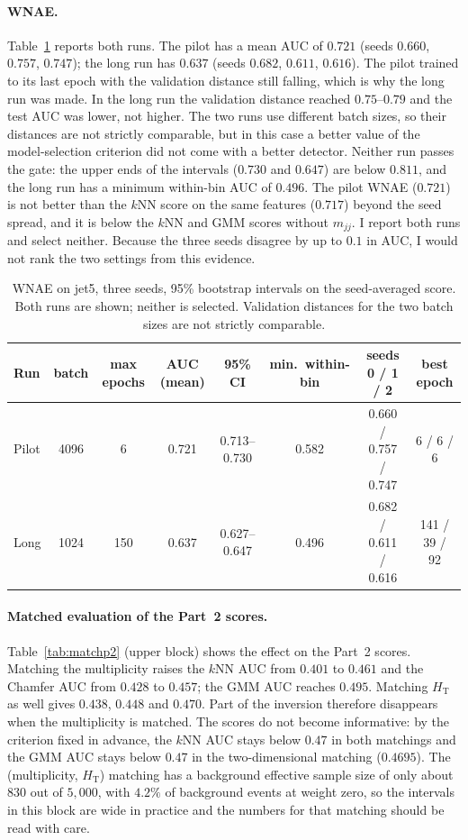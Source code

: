 \documentclass[11pt,a4paper]{article}
\newcommand{\HT}{\ensuremath{H_\mathrm{T}}\xspace}
\newcommand{\mjj}{\ensuremath{m_{jj}}\xspace}
\begin{document}
\paragraph{WNAE.}
Table~\ref{tab:wnae} reports both runs. The pilot has a mean AUC of $0.721$ (seeds $0.660$,
$0.757$, $0.747$); the long run has $0.637$ (seeds $0.682$, $0.611$, $0.616$). The pilot
trained to its last epoch with the validation distance still falling, which is why the long run was
made. In the long run the validation distance reached $0.75$--$0.79$ and the test AUC was lower, not
higher. The two runs use different batch sizes, so their distances are not strictly comparable, but
in this case a better value of the model-selection criterion did not come with a better detector.
Neither run passes the gate: the upper ends of the intervals ($0.730$ and $0.647$) are below $0.811$,
and the long run has a minimum within-bin AUC of $0.496$. The pilot WNAE ($0.721$) is not better than the
$k$NN score on the same features ($0.717$) beyond the seed spread, and it is below the $k$NN and
GMM scores without \mjj. I report both runs and select neither. Because the three seeds disagree by up to
$0.1$ in AUC, I would not rank the two settings from this evidence.

\begin{table}[t]
\centering
\caption{WNAE on jet5, three seeds, 95\% bootstrap intervals on the seed-averaged score.
Both runs are shown; neither is selected. Validation distances for the two batch sizes are not
strictly comparable.}
\label{tab:wnae}
\footnotesize\setlength{\tabcolsep}{4pt}
\begin{tabular}{lccccccc}
\toprule
Run & batch & max epochs & AUC (mean) & 95\% CI & min.\ within-bin & seeds 0 / 1 / 2 & best epoch \\
\midrule
Pilot & 4096 & 6   & 0.721 & 0.713--0.730 & 0.582 & 0.660 / 0.757 / 0.747 & 6 / 6 / 6 \\
Long  & 1024 & 150 & 0.637 & 0.627--0.647 & 0.496 & 0.682 / 0.611 / 0.616 & 141 / 39 / 92 \\
\bottomrule
\end{tabular}
\end{table}

\paragraph{Matched evaluation of the Part~2 scores.}
Table~\ref{tab:matchp2} (upper block) shows the effect on the Part~2 scores. Matching the multiplicity
raises the $k$NN AUC from $0.401$ to $0.461$ and the Chamfer AUC from $0.428$ to $0.457$; the GMM
AUC reaches $0.495$. Matching \HT as well gives $0.438$, $0.448$ and $0.470$. Part of the
inversion therefore disappears when the multiplicity is matched. The scores do not become
informative: by the criterion fixed in advance, the $k$NN AUC stays below $0.47$ in both matchings and
the GMM AUC stays below $0.47$ in the two-dimensional matching ($0.4695$). The (multiplicity, \HT) matching has a
background effective sample size of only about $830$ out of $5{,}000$, with $4.2\%$ of
background events at weight zero, so the intervals in this block are wide in practice and the numbers
for that matching should be read with care.
\end{document}

